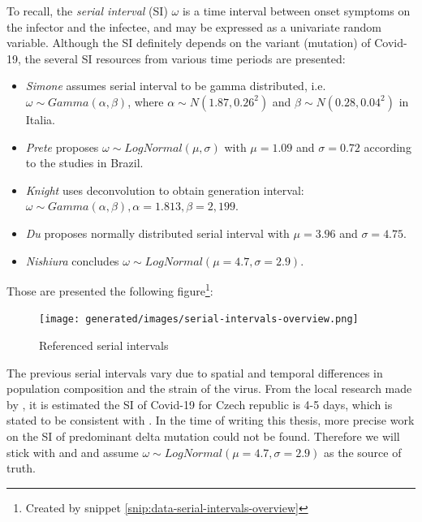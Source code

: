 \documentclass[
  digital, %
  oneside, %
  lof,     %
  lot,     %
]{fithesis4}
\begin{document}
To recall, the \textit{serial interval} (SI) $\omega$ is a time 
interval between onset symptoms on the infector and the 
infectee, and may be expressed as a univariate random variable. 
Although the SI definitely depends on the variant (mutation) of 
Covid-19, the several SI resources from various time periods are 
presented:

\begin{itemize}
  \item \textit{Simone} \cite{simone2020} assumes serial interval to be gamma 
  distributed, i.e. $\omega \sim Gamma(\alpha,\beta)$, where 
  $\alpha \sim N \left( 1.87, 0.26^2 \right)$ and 
  $\beta \sim N \left( 0.28, 0.04^2 \right)$ in Italia.

  \item \textit{Prete} \cite{prete2020} proposes $\omega \sim LogNormal(\mu, \sigma)$ 
  with $\mu = 1.09$ and $\sigma = 0.72$ according to the 
  studies in Brazil.

  \item \textit{Knight} \cite{knight2020} uses deconvolution 
  to obtain generation interval: $\omega \sim Gamma(\alpha, \beta), \alpha = 1.813, \beta = 2,199$.

  \item \textit{Du} \cite{du2020} proposes normally distributed serial 
  interval with $\mu = 3.96$ and $\sigma = 4.75$.

  \item \textit{Nishiura} \cite{nishiura2020} concludes 
  $\omega \sim LogNormal \left( \mu = 4.7, \sigma = 2.9 \right)$.
\end{itemize}

Those are presented the following figure\footnote{Created by snippet \ref{snip:data-serial-intervals-overview}}:

\begin{figure}[H]
  \begin{center}
    \texttt{[image: generated/images/serial-intervals-overview.png]}
  \end{center}
  \caption{Referenced serial intervals}
  \label{fig:serial-intervals-overview}
\end{figure}

The previous serial intervals vary due to spatial and 
temporal differences in population composition and the
strain of the virus.
From the local research made by \cite{majek2020}, 
it is estimated the SI of Covid-19 for Czech republic is 4-5 days, which is 
stated to be consistent with \cite{nishiura2020}. 
In the time of writing this thesis, more precise work on the 
SI of predominant delta mutation could not be found. 
Therefore we will stick with \cite{majek2020} and 
\cite{nishiura2020} and assume 
$\omega \sim LogNormal \left( \mu = 4.7, \sigma = 2.9 \right)$ 
as the source of truth. 
\end{document}
